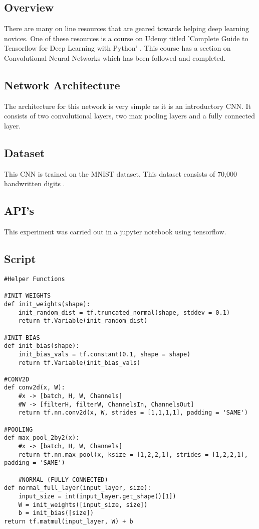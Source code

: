 \subsection*{Overview}
There are many on line resources that are geared towards helping deep learning novices.
One of these resources is a course on Udemy titled 'Complete Guide to Tensorflow for Deep Learning with Python' \parencite{udemy}.
This course has a section on Convolutional Neural Networks which has been followed and completed.

\subsection*{Network Architecture}
The architecture for this network is very simple as it is an introductory CNN.
It consists of two convolutional layers, two max pooling layers and a fully connected layer.

\subsection*{Dataset}
This CNN is trained on the MNIST dataset.
This dataset consists of 70,000 handwritten digits \parencite{mnist}.

\subsection*{API's}
This experiment was carried out in a jupyter notebook using tensorflow.

\subsection*{Script}
\begin{lstlisting}[style=Python]
#Helper Functions

#INIT WEIGHTS
def init_weights(shape):
    init_random_dist = tf.truncated_normal(shape, stddev = 0.1)
    return tf.Variable(init_random_dist)

#INIT BIAS
def init_bias(shape):
    init_bias_vals = tf.constant(0.1, shape = shape)
    return tf.Variable(init_bias_vals)

#CONV2D
def conv2d(x, W):
    #x -> [batch, H, W, Channels]
    #W -> [filterH, filterW, ChannelsIn, ChannelsOut]
    return tf.nn.conv2d(x, W, strides = [1,1,1,1], padding = 'SAME')

#POOLING
def max_pool_2by2(x):
    #x -> [batch, H, W, Channels]
    return tf.nn.max_pool(x, ksize = [1,2,2,1], strides = [1,2,2,1], padding = 'SAME')

    #NORMAL (FULLY CONNECTED)
def normal_full_layer(input_layer, size):
    input_size = int(input_layer.get_shape()[1])
    W = init_weights([input_size, size])
    b = init_bias([size])
return tf.matmul(input_layer, W) + b
\end{lstlisting}


